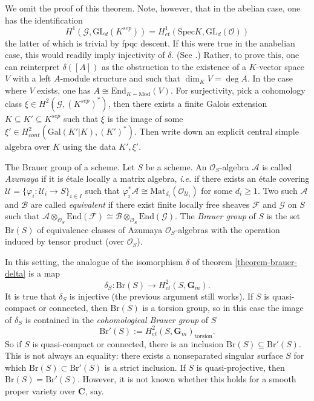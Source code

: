 \noindent
We omit the proof of this theorem. Note, however, that in the abelian case, one
has the identification
$$
H^1 (\mathcal{G}, \text{GL}_d(K^{sep})) = H_{et}^1 (\text{Spec} K,
\text{GL}_d(\mathcal{O}))
$$
the latter of which is trivial by fpqc descent. If this were true in the
anabelian case, this would readily imply injectivity of $\delta$. (See
\cite{SGA4.5}.) Rather, to prove this, one can reinterpret $\delta([A])$ as the
obstruction to the existence of a $K$-vector space $V$ with a left $A$-module
structure and such that $\dim_K V = \deg A$. In the case where $V$ exists, one
has $A \cong \text{End}_{K-\text{Mod}} (V)$. For surjectivity, pick a
cohomology class $\xi \in H^2(\mathcal{G}, (K^{sep})^*)$, then there exists a
finite Galois extension $K \subseteq K' \subseteq K^{sep}$ such that $\xi$ is
the image of some $\xi' \in H_{cont}^2(\text{Gal}(K'|K), (K')^*)$. Then write
down an explicit central simple algebra over $K$ using the data $K', \xi'$.

\medskip\noindent
The Brauer group of a scheme.
Let $S$ be a scheme. An $\mathcal{O}_S$-algebra $\mathcal{A}$ is called
{\it Azumaya} if it is \'etale locally a matrix algebra, {\it i.e.} if there
exists an \'etale covering $\mathcal{U} = \{ \varphi_i : \mathcal{U}_i \to S
\}_{i \in I}$ such that $\varphi_i^*\mathcal{A} \cong
\text{Mat}_{d_i}(\mathcal{O}_{\mathcal{U}_i})$ for some $d_i \geq 1$. Two such
$\mathcal{A}$ and $\mathcal{B}$ are called {\it equivalent} if there exist
finite locally free sheaves $\mathcal{F}$ and $\mathcal{G}$ on $S$ such that
$\mathcal{A} \otimes_{\mathcal{O}_S} \text{End}(\mathcal{F}) \cong \mathcal{B}
\otimes_{\mathcal{O}_S} \text{End}(\mathcal{G})$. The {\it Brauer group} of
$S$ is the set $\text{Br}(S)$ of equivalence classes of Azumaya
$\mathcal{O}_S$-algebras with the operation induced by tensor product (over
$\mathcal{O}_S$).

\medskip\noindent
In this setting, the analogue of the isomorphism $\delta$ of theorem
\ref{theorem-brauer-delta} is a map
$$
\delta_S: \text{Br}(S) \to H_{et}^2(S,\mathbf{G}_m).
$$
It is true that $\delta_S$ is injective (the previous argument still works). If
$S$ is quasi-compact or connected, then $\text{Br}(S)$ is a torsion group, so
in this case the image of $\delta_S$ is contained in the {\it cohomological
Brauer group} of $S$
$$
\text{Br}'(S) := H_{et}^2(S,\mathbf{G}_m)_\text{torsion}.
$$
So if $S$ is quasi-compact or connected, there is an inclusion $\text{Br}(S)
\subseteq \text{Br}'(S)$. This is not always an equality: there exists a
nonseparated singular surface $S$ for which $\text{Br}(S) \subset
\text{Br}'(S)$ is a strict inclusion. If $S$ is quasi-projective, then
$\text{Br}(S) = \text{Br}'(S)$. However, it is not known whether this holds for
a smooth proper variety over $\mathbf{C}$, say.


